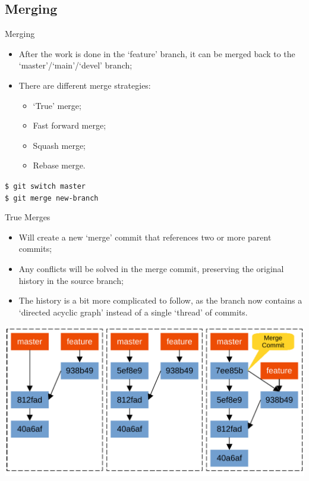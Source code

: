 \documentclass{beamer}
\begin{document}
\subsection{Merging}
\begin{frame}{Merging}
  \begin{itemize}
    \item After the work is done in the `feature' branch, it can be merged back to the `master'/`main'/`devel' branch;
    \item There are different merge strategies:
    \begin{itemize}
      \item `True' merge;
      \item Fast forward merge;
      \item Squash merge;
      \item Rebase merge.
    \end{itemize}
  \end{itemize}
  \begin{block}{}
    \texttt{\$ git switch master} \\
    \texttt{\$ git merge new-branch}
  \end{block}
\end{frame}

\begin{frame}{True Merges}
  \begin{itemize}
    \item Will create a new `merge' commit that references two or more parent commits;
    \item Any conflicts will be solved in the merge commit, preserving the original history in the source branch;
    \item The history is a bit more complicated to follow, as the branch now contains a `directed acyclic graph' instead of a single `thread' of commits.
  \end{itemize}
  \begin{center}
    \includegraphics[scale=0.5]{git-true-merge}
  \end{center}
\end{frame}
\end{document}
